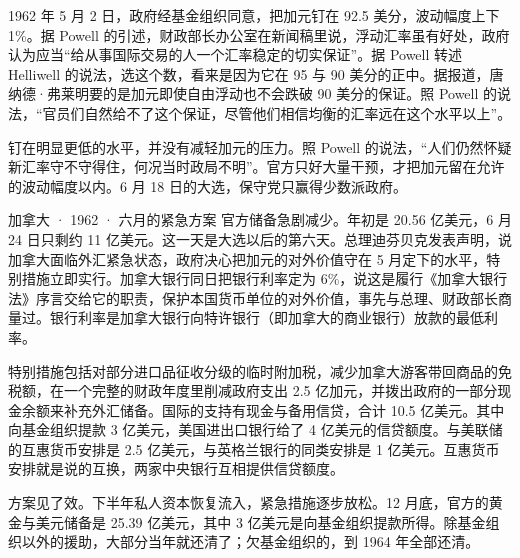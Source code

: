 1962 年 5 月 2 日，政府经基金组织同意，把加元钉在 92.5 美分，波动幅度上下 1\%\cite{powell2005,boc1962}。据 Powell 的引述，财政部长办公室在新闻稿里说，浮动汇率虽有好处，政府认为应当“给从事国际交易的人一个汇率稳定的切实保证”\cite{powell2005}。据 Powell 转述 Helliwell 的说法，选这个数，看来是因为它在 95 与 90 美分的正中\cite{powell2005}。据报道，唐纳德·弗莱明要的是加元即使自由浮动也不会跌破 90 美分的保证。照 Powell 的说法，“官员们自然给不了这个保证，尽管他们相信均衡的汇率远在这个水平以上”\cite{powell2005}。

钉在明显更低的水平，并没有减轻加元的压力\cite{powell2005}。照 Powell 的说法，“人们仍然怀疑新汇率守不守得住，何况当时政局不明”\cite{powell2005}。官方只好大量干预，才把加元留在允许的波动幅度以内\cite{powell2005}。6 月 18 日的大选，保守党只赢得少数派政府\cite{powell2005}。

\begin{case}{加拿大 · 1962 · 六月的紧急方案}
官方储备急剧减少。年初是 20.56 亿美元，6 月 24 日只剩约 11 亿美元\cite{boc1962}。这一天是大选以后的第六天。总理迪芬贝克发表声明，说加拿大面临外汇紧急状态，政府决心把加元的对外价值守在 5 月定下的水平，特别措施立即实行\cite{boc1962}。加拿大银行同日把银行利率定为 6\%，说这是履行《加拿大银行法》序言交给它的职责，保护本国货币单位的对外价值，事先与总理、财政部长商量过\cite{boc1962}。银行利率是加拿大银行向特许银行（即加拿大的商业银行）放款的最低利率。

特别措施包括对部分进口品征收分级的临时附加税，减少加拿大游客带回商品的免税额，在一个完整的财政年度里削减政府支出 2.5 亿加元，并拨出政府的一部分现金余额来补充外汇储备\cite{boc1962}。国际的支持有现金与备用信贷，合计 10.5 亿美元\cite{boc1962}。其中向基金组织提款 3 亿美元，美国进出口银行给了 4 亿美元的信贷额度\cite{boc1962}。与美联储的互惠货币安排是 2.5 亿美元，与英格兰银行的同类安排是 1 亿美元\cite{boc1962}。互惠货币安排就是说的互换，两家中央银行互相提供信贷额度。

方案见了效。下半年私人资本恢复流入，紧急措施逐步放松\cite{powell2005}。12 月底，官方的黄金与美元储备是 25.39 亿美元，其中 3 亿美元是向基金组织提款所得\cite{boc1962}。除基金组织以外的援助，大部分当年就还清了；欠基金组织的，到 1964 年全部还清\cite{powell2005}。
\end{case}

